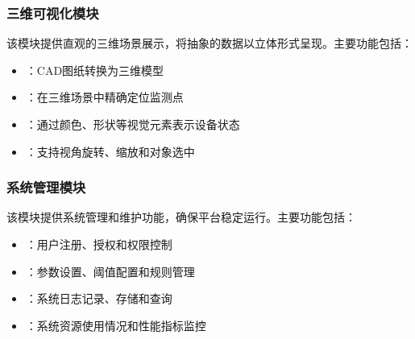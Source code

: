 \hypertarget{ux4e09ux7ef4ux53efux89c6ux5316ux6a21ux5757}{%
\subsubsection{三维可视化模块}\label{ux4e09ux7ef4ux53efux89c6ux5316ux6a21ux5757}}

该模块提供直观的三维场景展示，将抽象的数据以立体形式呈现。主要功能包括：

\begin{itemize}
\tightlist
\item
  ：CAD图纸转换为三维模型
\item
  ：在三维场景中精确定位监测点
\item
  ：通过颜色、形状等视觉元素表示设备状态
\item
  ：支持视角旋转、缩放和对象选中
\end{itemize}

\hypertarget{ux7cfbux7edfux7ba1ux7406ux6a21ux5757}{%
\subsubsection{系统管理模块}\label{ux7cfbux7edfux7ba1ux7406ux6a21ux5757}}

该模块提供系统管理和维护功能，确保平台稳定运行。主要功能包括：

\begin{itemize}
\tightlist
\item
  ：用户注册、授权和权限控制
\item
  ：参数设置、阈值配置和规则管理
\item
  ：系统日志记录、存储和查询
\item
  ：系统资源使用情况和性能指标监控
\end{itemize}

